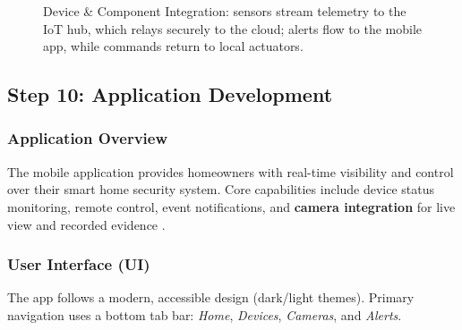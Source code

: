 \documentclass[conference]{IEEEtran}
\begin{document}
\begin{figure}[h]
{%
  }
  \caption{Device \& Component Integration: sensors stream telemetry to the IoT hub, which relays securely to the cloud; alerts flow to the mobile app, while commands return to local actuators.}
  \label{fig:device_integration_tikz}

\end{figure}
\FloatBarrier


\subsection{Step 10: Application Development}

\subsubsection{Application Overview}
The mobile application provides homeowners with real-time visibility and control over their smart home security system. Core capabilities include device status monitoring, remote control, event notifications, and \textbf{camera integration} for live view and recorded evidence \cite{startertutorials_IoT_methodology, design_implementation_smart_home_IoT_2024, yamini_home_intrusion_2016, sharma_iot_based_smart_home_automation_2020}.

\subsubsection{User Interface (UI)}
The app follows a modern, accessible design (dark/light themes). Primary navigation uses a bottom tab bar: \emph{Home}, \emph{Devices}, \emph{Cameras}, and \emph{Alerts}.
\end{document}

